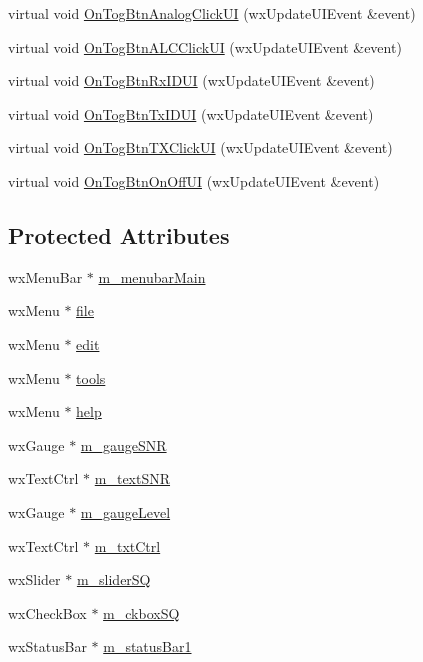 \begin{DoxyCompactItemize}
\item 
virtual void \hyperlink{class_top_frame_a4611d7f156c8868d04eeeefa7f2ac467}{On\-Tog\-Btn\-Analog\-Click\-U\-I} (wx\-Update\-U\-I\-Event \&event)
\item 
virtual void \hyperlink{class_top_frame_afb227da05a5d0e0f11bbb1f10b7fb4d1}{On\-Tog\-Btn\-A\-L\-C\-Click\-U\-I} (wx\-Update\-U\-I\-Event \&event)
\item 
virtual void \hyperlink{class_top_frame_a15a554fab55e81c5f0e98a2b3e938dbc}{On\-Tog\-Btn\-Rx\-I\-D\-U\-I} (wx\-Update\-U\-I\-Event \&event)
\item 
virtual void \hyperlink{class_top_frame_ab71dc2bbcd09439160c4f36cc98c7471}{On\-Tog\-Btn\-Tx\-I\-D\-U\-I} (wx\-Update\-U\-I\-Event \&event)
\item 
virtual void \hyperlink{class_top_frame_aa48d66a04f3b8325d8c9d5e14b2c0977}{On\-Tog\-Btn\-T\-X\-Click\-U\-I} (wx\-Update\-U\-I\-Event \&event)
\item 
virtual void \hyperlink{class_top_frame_abf60a90d0ddda9ff69496437bfe83a12}{On\-Tog\-Btn\-On\-Off\-U\-I} (wx\-Update\-U\-I\-Event \&event)
\end{DoxyCompactItemize}
\subsection*{Protected Attributes}
\begin{DoxyCompactItemize}
\item 
wx\-Menu\-Bar $\ast$ \hyperlink{class_top_frame_ab8388928329baa6623d0f70f070e6d19}{m\-\_\-menubar\-Main}
\item 
wx\-Menu $\ast$ \hyperlink{class_top_frame_a2f719fd825ff8e4dbf04bc734429b668}{file}
\item 
wx\-Menu $\ast$ \hyperlink{class_top_frame_a60ea330aef5ff340179c5ee637d3a204}{edit}
\item 
wx\-Menu $\ast$ \hyperlink{class_top_frame_a4471183520bb3cb8788cfa2e9786ea13}{tools}
\item 
wx\-Menu $\ast$ \hyperlink{class_top_frame_a2f92350d1f6b62ae32ba3eef2961db5f}{help}
\item 
wx\-Gauge $\ast$ \hyperlink{class_top_frame_aff23d43f975a63e1bfeec89f1ef19257}{m\-\_\-gauge\-S\-N\-R}
\item 
wx\-Text\-Ctrl $\ast$ \hyperlink{class_top_frame_a0e4812881b601e62d2ebf30579f9d451}{m\-\_\-text\-S\-N\-R}
\item 
wx\-Gauge $\ast$ \hyperlink{class_top_frame_a156842bf1e564d3a3bfbf8a17ae1df10}{m\-\_\-gauge\-Level}
\item 
wx\-Text\-Ctrl $\ast$ \hyperlink{class_top_frame_a7611a87ad6897f435cae4f9f972195b1}{m\-\_\-txt\-Ctrl}
\item 
wx\-Slider $\ast$ \hyperlink{class_top_frame_a73c219dba416e316b38bd6f095835aaf}{m\-\_\-slider\-S\-Q}
\item 
wx\-Check\-Box $\ast$ \hyperlink{class_top_frame_a29df670ba3a1603316bd0eb5b6b9300c}{m\-\_\-ckbox\-S\-Q}
\item 
wx\-Status\-Bar $\ast$ \hyperlink{class_top_frame_a71fa08a482cbad3b7b3121b25570c25a}{m\-\_\-status\-Bar1}
\end{DoxyCompactItemize}


